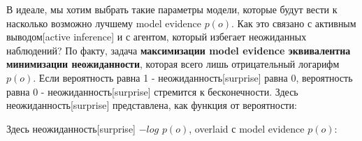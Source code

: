 \documentclass[twoside,leqno, 11pt]{article}
\begin{document}
	\begin{figure}[h]
		\label{ris:image}
	\end{figure}
	
	В идеале, мы хотим выбрать такие параметры модели, которые будут вести к насколько возможно лучшему model evidence $p(o)$. Как это связано с активным выводом[active inference] и с агентом, который избегает неожиданных наблюдений? По факту, задача \textbf{максимизации model evidence эквивалентна минимизации неожиданности}, которая всего лишь отрицательный логарифм $p(o)$. Если вероятность равна 1 - неожиданность[surprise] равна 0, вероятность равна 0 - неожиданность[surprise] стремится к бесконечности. Здесь неожиданность[surprise] представлена, как функция от вероятности:
	
	\begin{figure}[h]
		\label{ris:image}
	\end{figure}
	
	Здесь неожиданность[surprise] $-log$ $p(o)$, overlaid с model evidence $p(o)$:
	
	\begin{figure}[h!]
		\label{ris:image}
	\end{figure}
	
\end{document}
